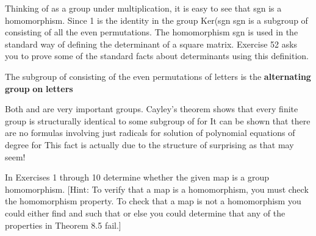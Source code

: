 \documentclass[11pt,oneside]{article}
\begin{document}
\begin{BookBody}
\noindent Thinking of  as a group under multiplication, it is easy to see that sgn is a homomorphism. Since 1 is the identity in the group  Ker(sgn\BookInline{)\; = } sgn is a subgroup of  consisting of all the even permutations. The homomorphism sgn is used in the standard way of defining the determinant of a square matrix. Exercise 52 asks you to prove some of the standard facts about determinants using this definition.

 The subgroup of  consisting of the even permutations of  letters is the\textbf{ alternating} \textbf{group}  \textbf{on}  \textbf{letters}\BookEnd{\blacksquare}

\noindent Both  and  are very important groups. Cayley’s theorem shows that every finite group  is structurally identical to some subgroup of  for  It can be shown that there are no formulas involving just radicals for solution of polynomial equations of degree  for  This fact is actually due to the structure of  surprising as that may seem!

\end{BookBody}

\BookNarrativefalse

\begin{BookBody}



\noindent In Exercises 1 through 10 determine whether the given map is a group homomorphism. [Hint: To verify that a map is a homomorphism, you must check the homomorphism property. To check that a map is not a homomorphism you could either find  and  such that  or else you could determine that any of the properties in Theorem 8.5 fail.]






\end{BookBody}
\end{document}
